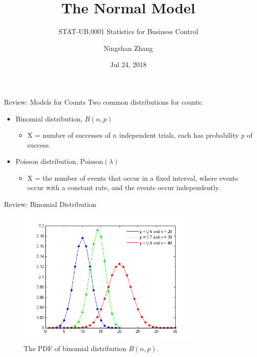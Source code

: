 \documentclass{beamer}
\title{The Normal Model}
\subtitle{STAT-UB.0001 Statistics for Business Control}
\author{Ningshan Zhang}
\institute[New York University] %
{
  IOMS Department\\
  nzhang@stern.nyu.edu
  \let\thefootnote\relax\footnotetext{\tiny{*  Office Hours: Wed \& Fri 10:00 - 11:30 AM, KMC 8-174}}
}
\date{Jul 24, 2018}
\begin{document}
\begin{frame}
  \titlepage
\end{frame}



\begin{frame}{Review: Models for Counts}
Two common distributions for counts:
\begin{itemize}
    \item Binomial distribution, $B(n,p)$
\begin{itemize}
        \item X = number of successes of $n$ independent trials, each has probability $p$ of success.
\end{itemize}
\item Poisson distribution, $\text{Poisson}(\lambda)$
\begin{itemize}
        \item X = the number of events that occur in a fixed interval, where events occur with a constant rate, and
            the events occur independently.
\end{itemize}

\end{itemize}
\end{frame}

\begin{frame}{Review: Binomial Distribution}
    \begin{figure}
        \caption{The PDF of binomial distribution $B(n,p)$.}
        \includegraphics[width=0.8\textwidth]{figures/Binomial_distribution_pdf.png}
    \end{figure}
\end{frame}
\end{document}
